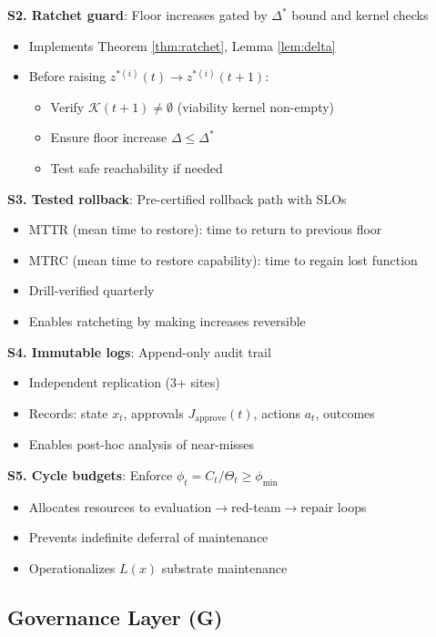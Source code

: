 \documentclass[11pt,a4paper]{article}
\theoremstyle{definition}
\newcommand{\K}{\mathcal{K}}
\begin{document}
\textbf{S2. Ratchet guard}: Floor increases gated by $\Delta^*$ bound and kernel checks
\begin{itemize}
\item Implements Theorem \ref{thm:ratchet}, Lemma \ref{lem:delta}
\item Before raising $z^{*(i)}(t) \to z^{*(i)}(t+1)$:
\begin{itemize}
\item Verify $\K(t+1) \neq \emptyset$ (viability kernel non-empty)
\item Ensure floor increase $\Delta \leq \Delta^*$
\item Test safe reachability if needed
\end{itemize}
\end{itemize}

\textbf{S3. Tested rollback}: Pre-certified rollback path with SLOs
\begin{itemize}
\item MTTR (mean time to restore): time to return to previous floor
\item MTRC (mean time to restore capability): time to regain lost function
\item Drill-verified quarterly
\item Enables ratcheting by making increases reversible
\end{itemize}

\textbf{S4. Immutable logs}: Append-only audit trail
\begin{itemize}
\item Independent replication (3+ sites)
\item Records: state $x_t$, approvals $J_{\text{approve}}(t)$, actions $a_t$, outcomes
\item Enables post-hoc analysis of near-misses
\end{itemize}

\textbf{S5. Cycle budgets}: Enforce $\phi_t = C_t/\Theta_t \geq \phi_{\min}$
\begin{itemize}
\item Allocates resources to evaluation$\to$red-team$\to$repair loops
\item Prevents indefinite deferral of maintenance
\item Operationalizes $L(x)$ substrate maintenance
\end{itemize}

\subsection{Governance Layer (G)}
\end{document}

